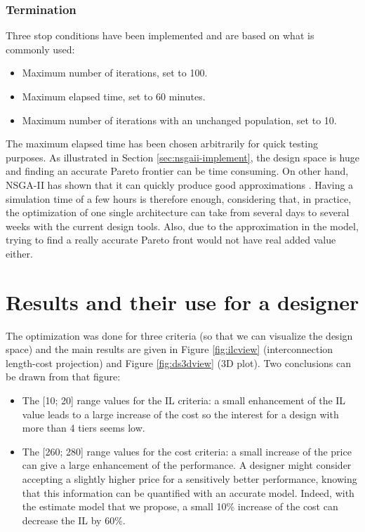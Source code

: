 \subsubsection{Termination}
Three stop conditions have been implemented and are based on what is commonly used:
\begin{itemize}
\item Maximum number of iterations, set to 100.
\item Maximum elapsed time, set to 60 minutes.
\item Maximum number of iterations with an unchanged population, set to 10.
\end{itemize}
The maximum elapsed time has been chosen arbitrarily for quick testing purposes. As illustrated in Section \ref{sec:nsgaii-implement}, the design space is huge and finding an accurate Pareto frontier can be time consuming. On other hand, NSGA-II has shown that it can quickly produce good approximations \cite{Deb00afast}. Having a simulation time of a few hours is therefore enough, considering that, in practice, the optimization of one single architecture can take from several days to several weeks with the current design tools. Also, due to the approximation in the model, trying to find a really accurate Pareto front would not have real added value either.

\section{Results and their use for a designer}
The optimization was done for three criteria (so that we can visualize the design space) and the main results are given in Figure \ref{fig:ilcview} (interconnection length-cost projection) and Figure \ref{fig:ds3dview} (3D plot). Two conclusions can be drawn from that figure:
\begin{itemize}
\item The [10; 20] range values for the IL criteria: a small enhancement of the IL value leads to a large increase of the cost so the interest for a design with more than 4 tiers seems low.
\item The [260; 280] range values for the cost criteria: a small increase of the price can give a large enhancement of the performance. A designer might consider accepting a slightly higher price for a sensitively better performance, knowing that this information can be quantified with an accurate model. Indeed, with the estimate model that we propose, a small 10\% increase of the cost can decrease the IL by 60\%.
\end{itemize}

